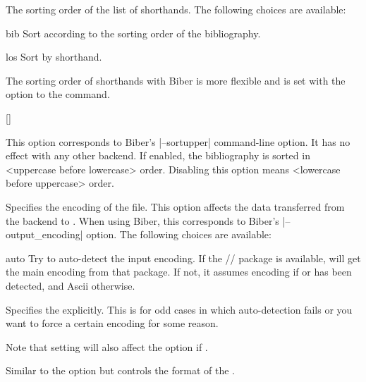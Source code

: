 \documentclass{ltxdockit}[2011/03/25]
\newcommand*{\biber}{Biber\xspace}
\begin{document}
\begin{optionlist}
The sorting order of the list of shorthands. The following choices are available:

\begin{valuelist}
\item[bib] Sort according to the sorting order of the bibliography.
\item[los] Sort by shorthand.
\end{valuelist}

The sorting order of shorthands with \biber is more flexible and is set with the  option to the  command.

[\BiberOnly]

This option corresponds to \biber's |--sortupper| command-line option. It has no effect with any other backend. If enabled, the bibliography is sorted in <uppercase before lowercase> order. Disabling this option means <lowercase before uppercase> order.


Specifies the encoding of the  file. This option affects the data transferred from the backend to . When using \biber, this corresponds to \biber's |--output_encoding| option. The following choices are available:

\begin{valuelist}

\item[auto] Try to auto-detect the input encoding. If the \slash {}\slash {} package is available,  will get the main encoding from that package. If not, it assumes \utf encoding if \xetex or \luatex has been detected, and Ascii otherwise.

\item[\prm{encoding}] Specifies the  explicitly. This is for odd cases in which auto-detection fails or you want to force a certain encoding for some reason.

\end{valuelist}
%
Note that setting  will also affect the  option if .


Similar to the  option but controls the format of the .


\end{optionlist}
\end{document}

